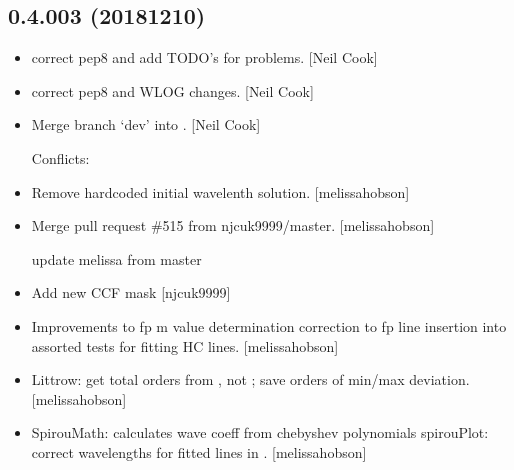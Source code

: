 \documentclass[a4paper,10pt,english]{report}
\begin{document}
\subsection{0.4.003 (2018\sphinxhyphen{}12\sphinxhyphen{}10)}
\label{\detokenize{misc/changelog:id262}}\begin{itemize}
\item {} 
 \sphinxhyphen{} correct pep8 and add TODO’s for problems.
{[}Neil Cook{]}

\item {} 
 \sphinxhyphen{} correct pep8 and WLOG changes. {[}Neil
Cook{]}

\item {} 
Merge branch ‘dev’ into . {[}Neil Cook{]}
\begin{description}
\item[{Conflicts:}] \leavevmode
{}

\end{description}

\item {} 
Remove hard\sphinxhyphen{}coded initial wavelenth solution. {[}melissa\sphinxhyphen{}hobson{]}

\item {} 
Merge pull request \#515 from njcuk9999/master. {[}melissa\sphinxhyphen{}hobson{]}

update melissa from master

\item {} 
Add new CCF mask  {[}njcuk9999{]}

\item {} 
Improvements to  fp m value determination
correction to fp line insertion into  assorted tests for
fitting HC lines. {[}melissa\sphinxhyphen{}hobson{]}

\item {} 
Littrow: get total orders from , not ; save
orders of min/max deviation. {[}melissa\sphinxhyphen{}hobson{]}

\item {} 
SpirouMath: calculates wave coeff from chebyshev polynomials
spirouPlot: correct wavelengths for fitted lines in
. {[}melissa\sphinxhyphen{}hobson{]}


\end{itemize}
\end{document}
